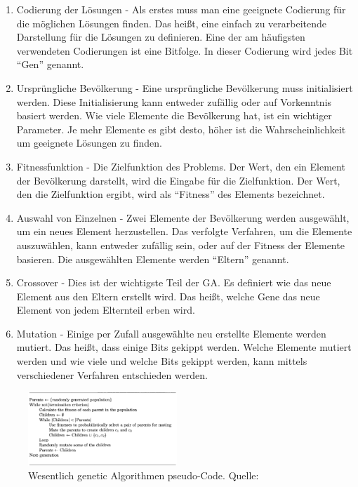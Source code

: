 \documentclass[twoside,twocolumn]{article}
\begin{document}
\begin{enumerate}
\item{Codierung der Lösungen - Als erstes muss man eine geeignete Codierung für die möglichen Lösungen finden. Das heißt, eine einfach zu verarbeitende Darstellung für die Lösungen zu definieren. Eine der am häufigsten verwendeten Codierungen ist eine Bitfolge. In dieser Codierung wird jedes Bit \enquote{Gen} genannt.}
\item{Ursprüngliche Bevölkerung - Eine ursprüngliche Bevölkerung muss initialisiert werden. Diese Initialisierung kann entweder zufällig oder auf Vorkenntnis basiert werden. Wie viele Elemente die Bevölkerung hat, ist ein wichtiger Parameter. Je mehr Elemente es gibt desto, höher ist die Wahrscheinlichkeit um geeignete Lösungen zu finden.}
\item{Fitnessfunktion - Die Zielfunktion des Problems. Der Wert, den ein Element der Bevölkerung darstellt, wird die Eingabe für die Zielfunktion. Der Wert, den die Zielfunktion ergibt, wird als \enquote{Fitness} des Elements bezeichnet.}
\item{Auswahl von Einzelnen - Zwei Elemente der Bevölkerung werden ausgewählt, um ein neues Element herzustellen. Das verfolgte Verfahren, um die Elemente auszuwählen, kann entweder zufällig sein, oder auf der Fitness der Elemente basieren. Die ausgewählten Elemente werden \enquote{Eltern} genannt.}
\item{Crossover - Dies ist der wichtigste Teil der GA. Es definiert wie das neue Element aus den Eltern erstellt wird. Das heißt, welche Gene das neue Element von jedem Elternteil erben wird.}
\item{Mutation - Einige per Zufall ausgewählte neu erstellte Elemente werden mutiert. Das heißt, dass einige Bits gekippt werden. Welche Elemente mutiert werden und wie viele und welche Bits gekippt werden, kann mittels verschiedener Verfahren entschieden werden.}
\end{enumerate}

\begin{figure}
\caption{Wesentlich genetic Algorithmen pseudo-Code. Quelle: \cite{wiley_evolutionary}}
\label{fig:ga_pseudo}
\centering
\includegraphics[width=0.5\textwidth]{images/ga_pseudo.png}
\end{figure}
\end{document}
